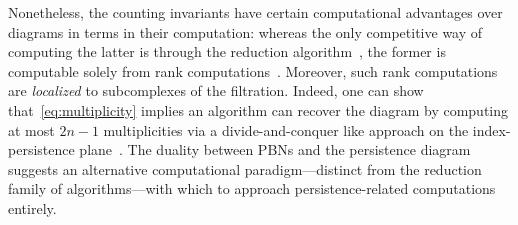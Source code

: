 \documentclass[12pt]{article}
\numberwithin{equation}{section}
\newcommand{\+}{%
	\raisebox{0.18ex}{\scaleobj{0.55}{+}}
}
\theoremstyle{definition}
\begin{document}
Nonetheless, the counting invariants have certain computational advantages over diagrams in terms in their computation: whereas the only competitive way of computing the latter is through the reduction algorithm~\cite{edelsbrunner2022computational}, the former is computable solely from rank computations~\cite{zomorodian2004computing}. 
Moreover, such rank computations are \emph{localized} to subcomplexes of the filtration. 
Indeed, one can show that~\eqref{eq:multiplicity} implies an algorithm can recover the diagram by computing at most $2n-1$ multiplicities via a divide-and-conquer like approach on the index-persistence plane~\cite{chen2011output}. The duality between PBNs and the persistence diagram suggests an alternative computational paradigm---distinct from the reduction family of algorithms---with which to approach persistence-related computations entirely. 
\end{document}
